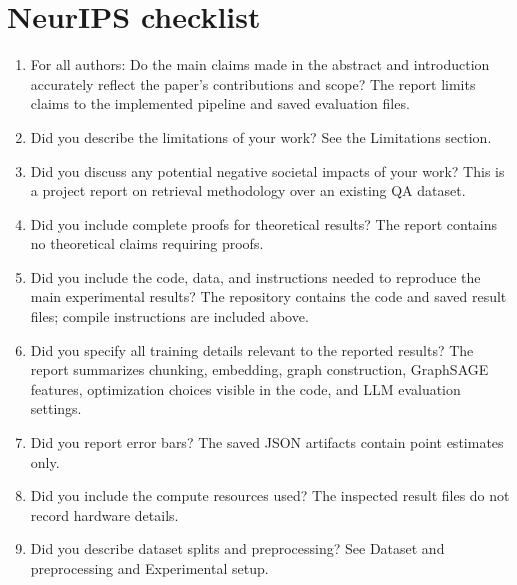 \documentclass{article}
\begin{document}



\appendix
\section{NeurIPS checklist}

\begin{enumerate}
  \item For all authors: Do the main claims made in the abstract and introduction accurately reflect the paper's contributions and scope? \answerYes{} The report limits claims to the implemented pipeline and saved evaluation files.
  \item Did you describe the limitations of your work? \answerYes{} See the Limitations section.
  \item Did you discuss any potential negative societal impacts of your work? \answerNA{} This is a project report on retrieval methodology over an existing QA dataset.
  \item Did you include complete proofs for theoretical results? \answerNA{} The report contains no theoretical claims requiring proofs.
  \item Did you include the code, data, and instructions needed to reproduce the main experimental results? \answerYes{} The repository contains the code and saved result files; compile instructions are included above.
  \item Did you specify all training details relevant to the reported results? \answerYes{} The report summarizes chunking, embedding, graph construction, GraphSAGE features, optimization choices visible in the code, and LLM evaluation settings.
  \item Did you report error bars? \answerNo{} The saved JSON artifacts contain point estimates only.
  \item Did you include the compute resources used? \answerNo{} The inspected result files do not record hardware details.
  \item Did you describe dataset splits and preprocessing? \answerYes{} See Dataset and preprocessing and Experimental setup.
\end{enumerate}
\end{document}
